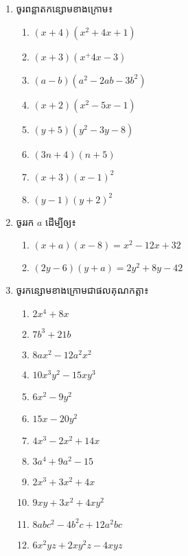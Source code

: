 \newpage
\problem

\begin{enumerate}
\item ចូរពន្លាតកន្សោមខាងក្រោម៖
\begin{multicols}{2}
\begin{enumerate}[label=\alph*.]
\item $(x+4)(x^2+4x+1)$
\item $(x+3)(x^+4x-3)$
\item $(a-b)(a^2-2ab-3b^2)$
\item $(x+2)(x^2-5x-1)$
\item $(y+5)(y^2-3y-8)$
\item $(3n+4)(n+5)$
\item $(x+3)(x-1)^2$
\item $(y-1)(y+2)^2$
\end{enumerate}
\end{multicols}
\item ចូររក $a$ ដើម្បីឲ្យ៖
\begin{multicols}{2}
\begin{enumerate}[label=\alph*.]
\item $(x+a)(x-8)=x^2-12x+32$
\item $(2y-6)(y+a)=2y^2+8y-42$
\end{enumerate}
\end{multicols}

\item ចូរកន្សោមខាងក្រោមជាផលគុណកត្តា៖
\begin{multicols}{2}
\begin{enumerate}[label=\alph*.]
\item $2x^4+8x$
\item $7b^3+21b$
\item $8ax^2-12a^2x^2$
\item $10x^3y^2-15xy^3$
\item $6x^2-9y^2$
\item $15x-20y^2$
\item $4x^3-2x^2+14x$
\item $3a^4+9a^2-15$
\item $2x^3+3x^2+4x$
\item $9xy+3x^2+4xy^2$
\item $8abc^2-4b^2c+12a^2bc$
\item $6x^2yz+2xy^2z-4xyz$
\end{enumerate}
\end{multicols}


\end{enumerate}
